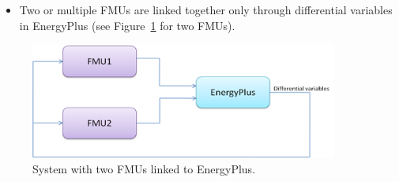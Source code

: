 \begin{itemize}
\tightlist
\item
  Two or multiple FMUs are linked together only through differential variables in EnergyPlus (see Figure~\ref{fig:system-with-two-fmus-linked-to-energyplus.} for two FMUs).
\end{itemize}

\begin{figure}[hbtp] %
\centering
\includegraphics[width=0.9\textwidth, height=0.9\textheight, keepaspectratio=true]{media/image034.png}
\caption{System with two FMUs linked to EnergyPlus. \protect \label{fig:system-with-two-fmus-linked-to-energyplus.}}
\end{figure}
